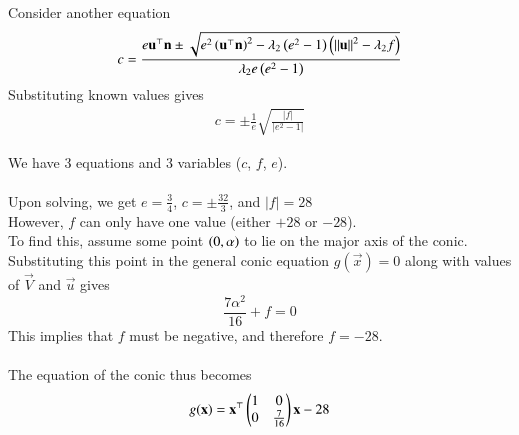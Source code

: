 \documentclass[journal]{IEEEtran}
\begin{document}
Consider another equation $$c=\frac{e\mathbf{u}^\top\mathbf{n}\pm\sqrt{e^2\left(\mathbf{u}^\top\mathbf{n}\right)^2-\lambda_2\left(e^2-1\right)\left(\left\lVert\mathbf{u}\right\rVert^2-\lambda_2f\right)}}{\lambda_2e\left(e^2-1\right)}$$
Substituting known values gives
\begin{align}
c=\pm\frac{1}{e}\sqrt{\frac{|f|}{|e^2-1|}}
\end{align}

We have 3 equations and 3 variables ($c$, $f$, $e$).
\\ \\
Upon solving, we get $e=\frac{3}{4}$, $c=\pm\frac{32}{3}$, and $|f|=28$
\\
However, $f$ can only have one value (either $+28$ or $-28$).
\\
To find this, assume some point $\left(0,\alpha\right)$ to lie on the major axis of the conic. Substituting this point in the general conic equation $g(\vec{x})=0$ along with values of $\vec{V}$ and $\vec{u}$ gives $$\frac{7\alpha^2}{16}+f=0$$
This implies that $f$ must be negative, and therefore $f=-28$.
\\ \\
The equation of the conic thus becomes $$g(\mathbf{x}) = \mathbf{x}^\top\begin{pmatrix}1&0\\0&\frac{7}{16}\end{pmatrix}\mathbf{x}-28$$
\end{document}
